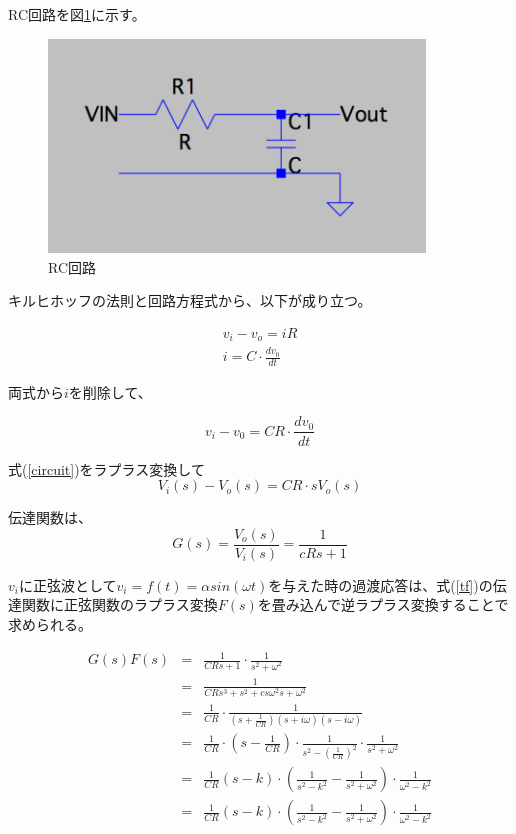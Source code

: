 \documentclass[]{jsarticle}
\begin{document}
RC回路を図\ref{rccircuit}に示す。

\begin{figure}
\centering
\includegraphics[width=100mm]{./image/rccircuit.pdf}
\caption{RC回路}
\label{rccircuit}
\end{figure}

キルヒホッフの法則と回路方程式から、以下が成り立つ。

\begin{eqnarray*}
v_{i} - v_{o} = i R \\
i = C \cdot \frac{d v_{0}}{dt}
\end{eqnarray*}

両式から$i$を削除して、

\begin{equation}
v_{i} - v_{0} = CR \cdot \frac{d v_{0}}{dt} \label{circuit}
\end{equation}

式(\ref{circuit})をラプラス変換して
\begin{equation}
 V_{i}(s) - V_{o}(s) = CR \cdot sV_{o}(s)
\end{equation}

伝達関数は、
\begin{equation}
 G(s) = \frac{V_{o}(s)}{V_{i}(s)} = \frac{1}{cR s+1} \label{tf}
\end{equation}

$v_{i}$に正弦波として$v_{i} = f(t) = \alpha sin (\omega t)$を与えた時の過渡応答は、式(\ref{tf})の伝達関数に正弦関数のラプラス変換$F(s)$を畳み込んで逆ラプラス変換することで求められる。

\begin{eqnarray*}
G(s)F(s) & = & \frac{1}{CRs+1} \cdot \frac{1}{s^{2}+\omega^{2}} \\
             & = & \frac{1}{CR s^{3}+s^{2}+cs\omega^{2}s+\omega^{2}} \\
             & = & \frac{1}{CR} \cdot \frac{1}{\left( s+\frac{1}{CR} \right)\left( s+i\omega \right)\left( s - i\omega\right)} \\
             & = & \frac{1}{CR} \cdot \left( s - \frac{1}{CR} \right) \cdot \frac{1}{s^{2} - \left( \frac{1}{CR} \right) ^{2}} \cdot \frac{1}{s^{2}+\omega^{2}} \\
             & = & \frac{1}{CR} \left( s - k \right) \cdot \left( \frac{1}{s^{2}-k^{2}} - \frac{1}{s^{2}+\omega^{2}} \right) \cdot \frac{1}{\omega^{2} - k^{2}} \\
             & = & \frac{1}{CR} \left( s - k \right) \cdot \left( \frac{1}{s^{2}-k^{2}} - \frac{1}{s^{2}+\omega^{2}} \right) \cdot \frac{1}{\omega^{2} - k^{2}} \\
             
\end{eqnarray*}
\end{document}
